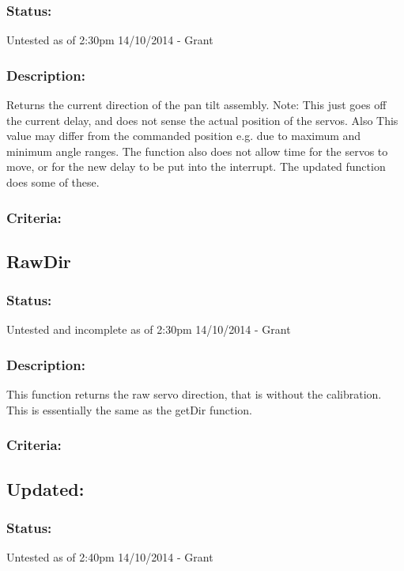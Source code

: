 \documentclass[]{report}
\begin{document}
\subsubsection{Status:}
Untested as of 2:30pm 14/10/2014 - Grant

\subsubsection{Description:}
Returns the current direction of the pan tilt assembly. Note: This just goes off the current delay, and does not sense the actual position of the servos. Also This value may differ from the commanded position e.g. due to maximum and minimum angle ranges. The function also does not allow time for the servos to move, or for the new delay to be put into the interrupt. The updated function does some of these.

\subsubsection{Criteria:}

\subsection{RawDir}
\subsubsection{Status:}
Untested and incomplete as of 2:30pm 14/10/2014 - Grant

\subsubsection{Description:}
This function returns the raw servo direction, that is without the calibration. This is essentially the same as the getDir function.

\subsubsection{Criteria:}

\subsection{Updated:}
\subsubsection{Status:}
Untested as of 2:40pm 14/10/2014 - Grant
\end{document}

